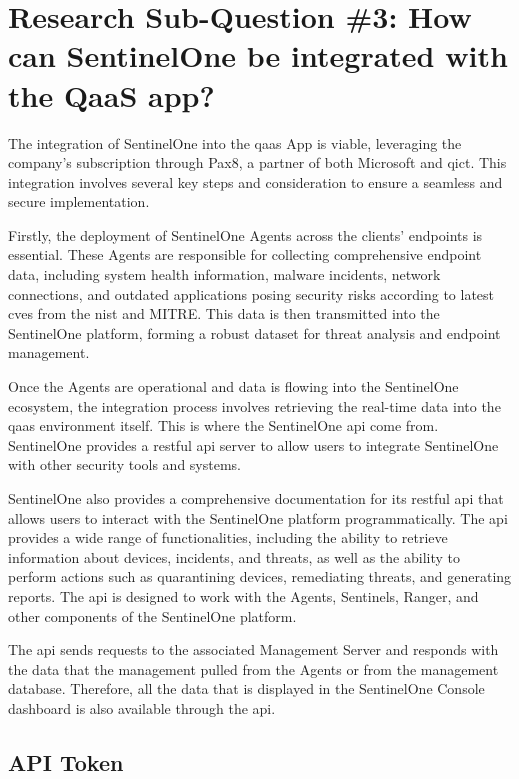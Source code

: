 \section{Research Sub-Question \#3: How can SentinelOne be integrated with the QaaS app?}

The integration of SentinelOne into the \acrshort{qaas} App is viable, leveraging the company's subscription through Pax8,
a partner of both Microsoft and \acrshort{qict}. This integration involves several key steps and consideration to ensure
a seamless and secure implementation.

Firstly, the deployment of SentinelOne Agents across the clients' endpoints is essential. These Agents are responsible
for collecting comprehensive endpoint data, including system health information, malware incidents, network connections,
and outdated applications posing security risks according to latest \acrshort{cve}s from the \acrshort{nist} and MITRE.
This data is then transmitted into the SentinelOne platform, forming a robust dataset for threat analysis and endpoint
management.

Once the Agents are operational and data is flowing into the SentinelOne ecosystem, the integration process involves
retrieving the real-time data into the \acrshort{qaas} environment itself. This is where the SentinelOne \acrshort{api}
come from. SentinelOne provides a \acrshort{rest}ful \acrshort{api} server to allow users to integrate SentinelOne with other
security tools and systems.

SentinelOne also provides a comprehensive documentation for its \acrshort{rest}ful \acrshort{api} that allows users to interact
with the SentinelOne platform programmatically. The \acrshort{api} provides a wide range of functionalities, including the ability
to retrieve information about devices, incidents, and threats, as well as the ability to perform actions such as quarantining devices,
remediating threats, and generating reports. The \acrshort{api} is designed to work with the Agents, Sentinels, Ranger, and other
components of the SentinelOne platform.

The \acrshort{api} sends requests to the associated Management Server and responds with the data that the management pulled from
the Agents or from the management database. Therefore, all the data that is displayed in the SentinelOne Console dashboard is also
available through the \acrshort{api}.

\subsection{API Token}

